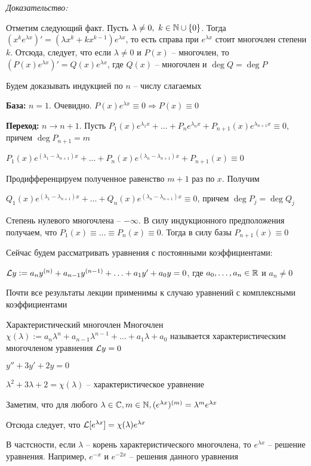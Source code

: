 \documentclass[12pt]{article}
\begin{document}
\textit{Доказательство:}

Отметим следующий факт. Пусть $\lambda \neq 0,\ k \in \mathbb N \cup \{0\}$. Тогда $(x^ke^{\lambda x})' = (\lambda x^k + kx^{k - 1})e^{\lambda x}$, то есть справа при $e^{\lambda x}$ стоит многочлен степени $k$. Отсюда, следует, что если $\lambda \neq 0$ и $P(x)$ -- многочлен, то $(P(x)e^{\lambda x})' = Q(x)e^{\lambda x}$, где $Q(x)$ -- многочлен и $\deg Q = \deg P$

Будем доказывать индукцией по $n$ -- числу слагаемых 

\textbf{База:} $n = 1$. Очевидно. $P(x)e^{\lambda x} \equiv 0 \Rightarrow P(x) \equiv 0$

\textbf{Переход:} $n \to n + 1$. Пусть $P_1(x)e^{\lambda_1x} + \ldots + P_ne^{\lambda_nx} + P_{n + 1}(x)e^{\lambda_{n + 1}x} \equiv 0$, причем $\deg P_{n + 1} = m$

$P_1(x)e^{(\lambda_1 - \lambda_{n + 1})x} + \ldots + P_n(x)e^{(\lambda_n - \lambda_{n + 1})x} + P_{n + 1}(x) \equiv 0$

Продифференцируем полученное равенство $m + 1$ раз по $x$. Получим 

$Q_1(x)e^{(\lambda_1 - \lambda_{n + 1})x} + \ldots + Q_n(x)e^{(\lambda_n - \lambda_{n + 1})x} \equiv 0$, причем $\deg P_j = \deg Q_j$

Степень нулевого многочлена -- $- \infty$. В силу индукционного предположения получаем, что $P_1(x) \equiv \ldots \equiv P_n(x) \equiv 0$. Тогда в силу базы $P_{n + 1}(x) \equiv 0$

\begin{nota}{}
    Сейчас будем рассматривать уравнения с постоянными коэффициентами: 

    $\mathcal{L} y := a_ny^{(n)} + a_{n - 1}y^{(n - 1)} + \ldots + a_1y' + a_0y = 0$, где $a_0, \ldots, a_n \in \mathbb R$ и $a_n \neq 0$
\end{nota}

\begin{Remark}{}
    Почти все результаты лекции применимы к случаю уравнений с комплексными коэффициентами 
\end{Remark}

\begin{defin}{Характеристический многочлен}
    Многочлен $\chi(\lambda) := a_n\lambda^n + a_{n - 1}\lambda^{n - 1} + \ldots + a_1\lambda + a_0$ называется характеристическим многочленом уравнения $\mathcal{L} y = 0$
\end{defin}

\begin{Example}{}
    $y'' + 3y' + 2y = 0$

    $\lambda^2 + 3\lambda + 2 = \chi(\lambda)$ -- характеристическое уравнение 

    Заметим, что для любого $\lambda \in \mathbb C, m \in \mathbb N, (e^{\lambda x})^{(m)} = \lambda^me^{\lambda x}$
    
    Отсюда следует, что $\mathcal{L}[e^{\lambda x}] = \chi(\lambda)e^{\lambda x}$

    В частсности, если $\lambda$ -- корень характеристического многочлена, то $e^{\lambda x}$ -- решение уравнения. Например, $e^{-x}$ и $e^{-2x}$ -- решения данного уравнения
\end{Example}
\end{document}
